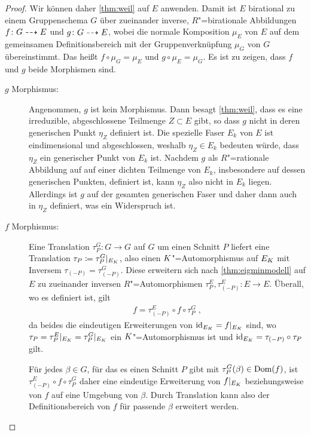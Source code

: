 \begin{Lemma}
\begin{proof}
    Wir können daher \ref{thm:weil} auf $E$ anwenden. Damit ist $E$
    birational zu einem Gruppenschema $G$ über zueinander inverse,
    $R$"=birationale Abbildungen  ${f\colon G\dashrightarrow E}$ und
    ${g\colon G\dashrightarrow E}$, wobei die normale Komposition $\mu_E$ von
    $E$ auf dem gemeinsamen Definitionsbereich mit der
    Gruppenverknüpfung $\mu_G$ von $G$ übereinstimmt. Das heißt
    $f\circ\mu_G=\mu_E$ und $g\circ\mu_E=\mu_G$.
    Es ist zu zeigen, dass $f$ und $g$ beide Morphismen sind.
    \begin{description}
    \item[$g$ Morphismus:] Angenommen, $g$ ist kein
      Morphismus. Dann besagt \ref{thm:weil}, dass es eine
      irreduzible, abgeschlossene Teilmenge $Z\subset E$ gibt, so
      dass $g$ nicht in deren generischen Punkt $\eta_Z$ definiert
      ist. Die spezielle Faser $E_k$ von $E$ ist eindimensional und
      abgeschlossen, weshalb $\eta_Z\in E_k$ bedeuten würde, dass
      $\eta_Z$ ein generischer Punkt von $E_k$ ist.
      Nachdem $g$ als $R$"=rationale Abbildung auf auf einer
      dichten Teilmenge von $E_k$, insbesondere auf dessen
      generischen Punkten, definiert ist, kann $\eta_Z$ also nicht in
      $E_k$ liegen.
      Allerdings ist $g$ auf der gesamten generischen Faser und daher
      dann auch in $\eta_Z$ definiert, was ein Widerspruch ist.
    \item[$f$ Morphismus:] Eine Translation $\tau_P^G\colon G\to G$
      auf $G$ um einen Schnitt $P$ liefert eine Translation
      $\tau_P\coloneqq\tau_P^G|_{E_{K}}$, also einen
      $K$"=Automorphismus auf $E_{K}$ mit Inversem
      $\tau_{(-P)}=\tau_{(-P)}^G$. Diese 
      erweitern sich nach \ref{thm:eigminmodell} auf $E$ zu zueinander
      inversen $R$"=Automorphismen
      ${\tau_P^E,\tau_{(-P)}^E\colon E\to E}$.
      Überall, wo es definiert ist, gilt
      \begin{gather*}
        f = \tau_{(-P)}^E\circ f\circ \tau_P^G\;,
      \end{gather*}
      da beides die eindeutigen Erweiterungen von
      $\mathrm{id}_{E_{K}}=f|_{E_{K}}$ sind, wo
      ${\tau_P=\tau_P^E|_{E_{K}}=\tau_P^G|_{E_{K}}}$ ein
      $K$"=Automorphismus ist und ${\mathrm{id}_{E_{K}}=\tau_{(-P)}\circ\tau_P}$
      gilt.
      
      Für jedes $\beta\in G$, für das es einen Schnitt $P$ gibt mit
      ${\tau_P^G(\beta)\in\operatorname{Dom}(f)}$, ist ${\tau_{(-P)}^E\circ f\circ
      \tau_P^G}$ daher eine eindeutige Erweiterung von $f|_{E_{K}}$
      beziehungsweise von $f$ auf eine Umgebung von $\beta$.
      Durch Translation kann also der Definitionsbereich von $f$ für
      passende $\beta$ erweitert werden. 


\end{description}
\end{proof}
\end{Lemma}
